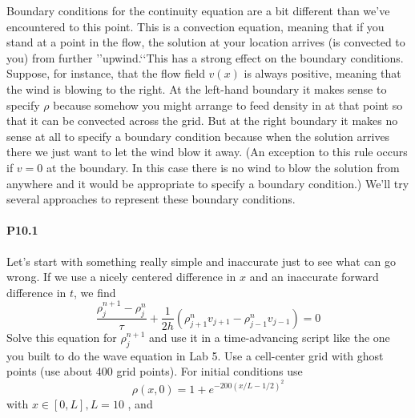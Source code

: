 \documentclass{book}
\theoremstyle{plain}
\theoremstyle{definition}
\numberwithin{exm}{chapter}
\theoremstyle{remark}
\theoremstyle{summary}
\theoremstyle{overview}
\begin{document}
Boundary conditions for the continuity equation are a bit different than we\rq ve encountered to this point. This is a convection equation, meaning that if you stand at a point in the flow, the solution at your location arrives (is convected to you) from further \rq\rq upwind.\lq\lq This has a strong effect on the boundary conditions. Suppose, for instance, that the flow field $v(x)$ is always positive, meaning that the wind is blowing to the right. At the left-hand boundary it makes sense to specify $\rho$ because somehow you might arrange to feed density in at that point so that it can be convected across the grid. But at the right boundary it makes no sense at all to specify a boundary condition because when the solution arrives there we just want to let the wind blow it away. (An exception to this rule occurs if $v=0$ at the boundary. In this case there is no wind to blow the solution from anywhere and it would be appropriate to specify a boundary condition.) We\rq ll try several approaches to represent these boundary conditions.

\paragraph*{P10.1}
Let\rq s start with something really simple and inaccurate just to see what can
go wrong. If we use a nicely centered difference in $x$ and an inaccurate
forward difference in $t$, we find
\begin{equation}\label{eq:102}
\frac{\rho_{j}^{n+1}-\rho_{j}^{n}}{\tau}+\frac{1}{2 h}\left(\rho_{j+1}^{n} v_{j+1}-\rho_{j-1}^{n} v_{j-1}\right)=0
\end{equation}
Solve this equation for $\rho_{j}^{n+1}$ and use it in a time-advancing script like the one you built to do the wave equation in Lab 5. Use a cell-center grid with ghost points (use about 400 grid points). For initial conditions use
\begin{equation}\label{eq:103}
\rho(x, 0)=1+e^{-200(x / L-1 / 2)^{2}}
\end{equation}
with $ x \in[0, L], L=10$ , and
\end{document}
